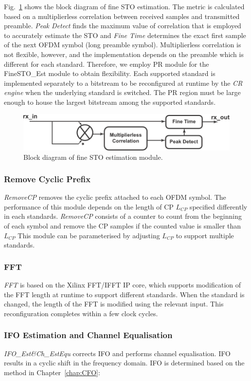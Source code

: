 Fig.~\ref{fig:STO} shows the block diagram of fine STO estimation.
The metric is calculated based on a multiplierless correlation between received samples and transmitted preamble.
\emph{Peak Detect} finds the maximum value of correlation that is employed to accurately estimate the STO and \emph{Fine Time} determines the exact first sample of the next OFDM symbol (long preamble symbol).
Multiplierless correlation is not flexible, however, and the implementation depends on the preamble which is different for each standard.
Therefore, we employ PR module for the {FineSTO\_Est} module to obtain flexibility.
Each supported standard is implemented separately to a bitstream to be reconfigured at runtime by the \emph{CR engine} when the underlying standard is switched.
The PR region must be large enough to house the largest bitstream among the supported standards.
\begin{figure}
\centering
\includegraphics [width=0.9\columnwidth]{Figures/MSCR_RX_STO.pdf}
\caption{Block diagram of fine STO estimation module.}
\label{fig:STO}
\end{figure}

\subsubsection{Remove Cyclic Prefix}
\emph{RemoveCP} removes the cyclic prefix attached to each OFDM symbol.
The performance of this module depends on the length of CP $L_{CP}$ specified differently in each standards.
\emph{RemoveCP} consists of a counter to count from the beginning of each symbol and remove the CP samples if the counted value is smaller than $L_{CP}$
This module can be parameterised by adjusting $L_{CP}$ to support multiple standards.

\subsubsection{FFT}
\emph{FFT} is based on the Xilinx FFT/IFFT IP core, which supports modification of the FFT length at runtime to support different standards. When the standard is changed, the length of the FFT is modified using the relevant input. This reconfiguration completes within a few clock cycles.

\subsubsection{IFO Estimation and Channel Equalisation}
\emph{IFO\_Est\&Ch\_EstEqu} corrects IFO and performs channel equalisation.
IFO results in a cyclic shift in the frequency domain.
IFO is determined based on the method in Chapter~\ref{chap:CFO}:

